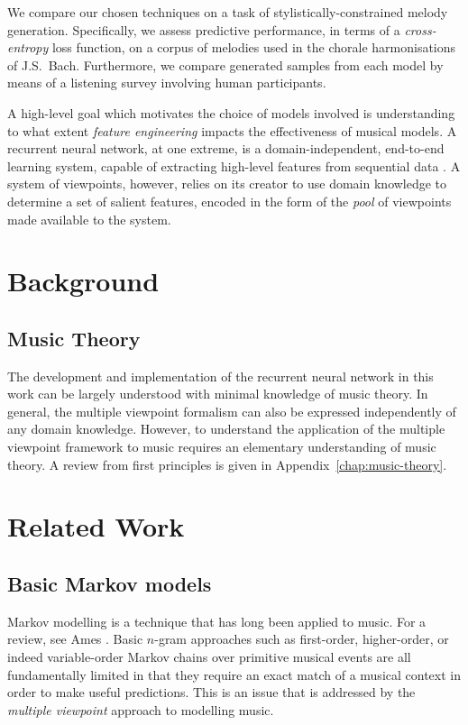 \documentclass[12pt,a4paper,twoside,openright]{report}
\begin{document}
We compare our chosen techniques on a task of stylistically-constrained melody
generation. Specifically, we assess predictive performance, in terms of a
\emph{cross-entropy} loss function, on a corpus of melodies used in the chorale
harmonisations of J.S.\ Bach. Furthermore, we compare generated samples from
each model by means of a listening survey involving human participants.

A high-level goal which motivates the choice of models involved is understanding
to what extent \emph{feature engineering} impacts the effectiveness of musical
models. A recurrent neural network, at one extreme, is a domain-independent,
end-to-end learning system, capable of extracting high-level features from
sequential data \cite{Goodfellow-et-al-2016}. A system of viewpoints, however,
relies on its creator to use domain knowledge to determine a set of salient
features, encoded in the form of the \emph{pool} of viewpoints made available to
the system.

\section{Background}

\subsection{Music Theory}

The development and implementation of the recurrent neural network in this work
can be largely understood with minimal knowledge of music theory. In general,
the multiple viewpoint formalism can also be expressed independently of any
domain knowledge.  However, to understand the application of the multiple
viewpoint framework to music requires an elementary understanding of music
theory. A review from first principles is given in
Appendix~\ref{chap:music-theory}.

\section{Related Work}

\subsection{Basic Markov models}

Markov modelling is a technique that has long been applied to music. For a
review, see Ames \cite{ames1989markov}. Basic $n$-gram approaches such as
first-order, higher-order, or indeed variable-order Markov chains over primitive
musical events are all fundamentally limited in that they require an exact match
of a musical context in order to make useful predictions. This is an issue that
is addressed by the \emph{multiple viewpoint} approach to modelling music.
\end{document}
